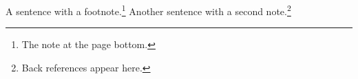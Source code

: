 \documentclass{article}
\begin{document}
A sentence with a footnote.\footnote{The note at the page bottom.}
Another sentence with a second note.\footnote{Back references appear here.}
\end{document}
